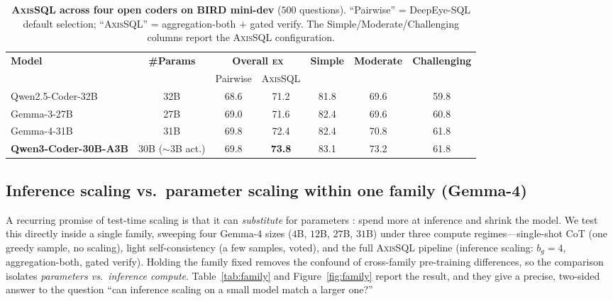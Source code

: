 \documentclass{article}
\newcommand{\sys}{\textsc{AxisSQL}\xspace}
\newcommand{\ex}{\textsc{ex}\xspace}
\newcommand{\bestcell}[1]{\textbf{#1}}
\begin{document}
\begin{table}[t]
\centering
\small
\caption{\textbf{\sys{} across four open coders on BIRD mini-dev} ($500$ questions). ``Pairwise'' = DeepEye-SQL default selection; ``\sys'' = aggregation-both $+$ gated verify. The Simple/Moderate/Challenging columns report the \sys{} configuration.}
\label{tab:main}
\begin{tabular}{@{}lcccccc@{}}
\toprule
\multirow{2}{*}{\textbf{Model}} & \multirow{2}{*}{\textbf{\#Params}} & \multicolumn{2}{c}{\textbf{Overall \ex}} & \multirow{2}{*}{\textbf{Simple}} & \multirow{2}{*}{\textbf{Moderate}} & \multirow{2}{*}{\textbf{Challenging}} \\
\cmidrule(lr){3-4}
 & & Pairwise & \sys & & & \\
\midrule
Qwen2.5-Coder-32B        & 32B       & 68.6 & 71.2 & 81.8 & 69.6 & 59.8 \\
Gemma-3-27B              & 27B       & 69.0 & 71.6 & 82.4 & 69.6 & 60.8 \\
Gemma-4-31B              & 31B       & 69.8 & 72.4 & 82.4 & 70.8 & 61.8 \\
\textbf{Qwen3-Coder-30B-A3B} & 30B ($\sim$3B act.) & 69.8 & \bestcell{73.8} & 83.1 & 73.2 & 61.8 \\
\bottomrule
\end{tabular}
\end{table}


\subsection{Inference scaling vs.\ parameter scaling within one family (Gemma-4)}
\label{sec:family}

A recurring promise of test-time scaling is that it can \emph{substitute} for parameters \citep{snell2025scaling}: spend more at inference and shrink the model. We test this directly inside a single family, sweeping four Gemma-4 sizes ($4$B, $12$B, $27$B, $31$B) under three compute regimes---single-shot CoT (one greedy sample, no scaling), light self-consistency (a few samples, voted), and the full \sys{} pipeline (inference scaling: $b_g{=}4$, aggregation-both, gated verify). Holding the family fixed removes the confound of cross-family pre-training differences, so the comparison isolates \emph{parameters vs.\ inference compute}. Table~\ref{tab:family} and Figure~\ref{fig:family} report the result, and they give a precise, two-sided answer to the question ``can inference scaling on a small model match a larger one?''
\end{document}
